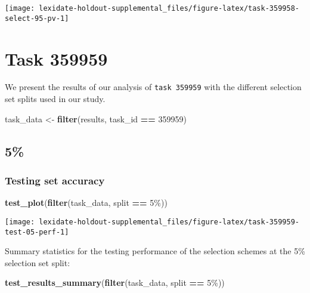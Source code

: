 \documentclass[
]{book}
\newenvironment{Shaded}{\begin{snugshade}}{\end{snugshade}}
\newcommand{\DecValTok}[1]{\textcolor[rgb]{0.00,0.00,0.81}{#1}}
\newcommand{\FunctionTok}[1]{\textcolor[rgb]{0.13,0.29,0.53}{\textbf{#1}}}
\newcommand{\NormalTok}[1]{#1}
\newcommand{\OtherTok}[1]{\textcolor[rgb]{0.56,0.35,0.01}{#1}}
\newcommand{\SpecialCharTok}[1]{\textcolor[rgb]{0.81,0.36,0.00}{\textbf{#1}}}
\newcommand{\StringTok}[1]{\textcolor[rgb]{0.31,0.60,0.02}{#1}}
\begin{document}
\texttt{[image: lexidate-holdout-supplemental\_files/figure-latex/task-359958-select-95-pv-1]}

\hypertarget{task-359959}{%
\chapter{Task 359959}\label{task-359959}}

We present the results of our analysis of \texttt{task\ 359959} with the different selection set splits used in our study.

\begin{Shaded}
\begin{Highlighting}[]
\NormalTok{task\_data }\OtherTok{\textless{}{-}} \FunctionTok{filter}\NormalTok{(results, task\_id }\SpecialCharTok{==} \DecValTok{359959}\NormalTok{)}
\end{Highlighting}
\end{Shaded}

\hypertarget{section-35}{%
\section{5\%}\label{section-35}}

\hypertarget{testing-set-accuracy-35}{%
\subsection{Testing set accuracy}\label{testing-set-accuracy-35}}

\begin{Shaded}
\begin{Highlighting}[]
\FunctionTok{test\_plot}\NormalTok{(}\FunctionTok{filter}\NormalTok{(task\_data, split }\SpecialCharTok{==} \StringTok{\textquotesingle{}5\%\textquotesingle{}}\NormalTok{))}
\end{Highlighting}
\end{Shaded}

\texttt{[image: lexidate-holdout-supplemental\_files/figure-latex/task-359959-test-05-perf-1]}

Summary statistics for the testing performance of the selection schemes at the 5\% selection set split:

\begin{Shaded}
\begin{Highlighting}[]
\FunctionTok{test\_results\_summary}\NormalTok{(}\FunctionTok{filter}\NormalTok{(task\_data, split }\SpecialCharTok{==} \StringTok{\textquotesingle{}5\%\textquotesingle{}}\NormalTok{))}
\end{Highlighting}
\end{Shaded}
\end{document}
